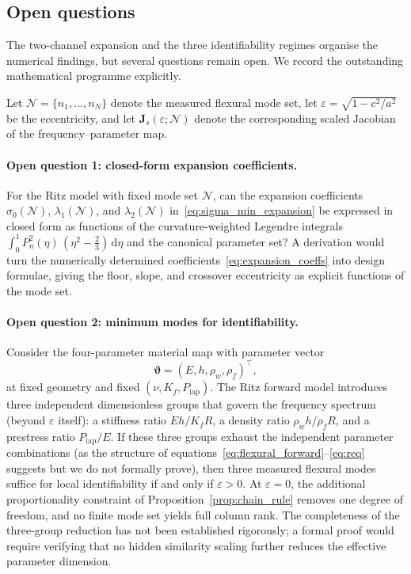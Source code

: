 \subsection{Open questions}\label{sec:open_questions}

The two-channel expansion and the three identifiability regimes organise the
numerical findings, but several questions remain open.  We record the
outstanding mathematical programme explicitly.

Let $\mathcal{N}=\{n_1,\ldots,n_N\}$ denote the measured flexural mode set,
let $\varepsilon=\sqrt{1-c^2/a^2}$ be the eccentricity, and let
$\mathbf{J}_s(\varepsilon;\mathcal{N})$ denote the corresponding scaled
Jacobian of the frequency--parameter map.

\paragraph{Open question 1: closed-form expansion coefficients.}
\label{conj:expansion}
For the Ritz model with fixed mode set $\mathcal{N}$, can the expansion
coefficients $\sigma_0(\mathcal{N})$, $\lambda_1(\mathcal{N})$, and
$\lambda_2(\mathcal{N})$ in~\eqref{eq:sigma_min_expansion} be expressed
in closed form as functions of the curvature-weighted Legendre integrals
$\int_0^1 P_n^2(\eta)\,(\eta^2 - \tfrac{2}{3})\,\mathrm{d}\eta$ and the
canonical parameter set?  A derivation would turn the numerically determined
coefficients~\eqref{eq:expansion_coeffs} into design formulae, giving the
floor, slope, and crossover eccentricity as explicit functions of the mode
set.

\paragraph{Open question 2: minimum modes for identifiability.}
\label{conj:min_modes}
Consider the four-parameter material map with parameter vector
\begin{equation}
  \boldsymbol{\vartheta} = (E,h,\rho_w,\rho_f)^\top,
\end{equation}
at fixed geometry and fixed $(\nu,K_f,P_\mathrm{iap})$.  The Ritz forward
model introduces three independent dimensionless groups that govern the
frequency spectrum (beyond $\varepsilon$ itself): a stiffness ratio
$Eh/K_f R$, a density ratio $\rho_w h/\rho_f R$, and a prestress ratio
$P_\mathrm{iap}/E$.  If these three groups exhaust the independent parameter
combinations (as the structure of
equations~\eqref{eq:flexural_forward}--\eqref{eq:req} suggests but we do not
formally prove), then three measured flexural modes suffice for local
identifiability if and only if $\varepsilon>0$.  At $\varepsilon=0$, the
additional proportionality constraint of Proposition~\ref{prop:chain_rule}
removes one degree of freedom, and no finite mode set yields full column rank.
The completeness of the three-group reduction has not been established
rigorously; a formal proof would require verifying that no hidden similarity
scaling further reduces the effective parameter dimension.

